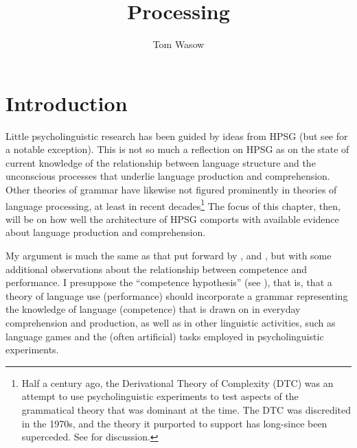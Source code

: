 \documentclass[a4paper]{article}
\title{Processing}
\author{Tom Wasow}
\begin{document}
\maketitle


\section{Introduction}

Little psycholinguistic research has been guided by ideas from HPSG (but see  \citet{Konieczny96a-u} for a notable exception).  This is not so much a reflection on HPSG as on the state of current knowledge of the relationship between language structure and the unconscious processes that underlie language production and comprehension.  Other theories of grammar have likewise not figured prominently in theories of language processing, at least in recent decades\footnote{Half a century ago, the Derivational Theory of Complexity (DTC) was an attempt to use psycholinguistic experiments to test aspects of the grammatical theory that was dominant at the time.  The DTC was discredited in the 1970s, and the theory it purported to support has long-since been superceded.  See \citet{FBG74a-u} for discussion.}  The focus of this chapter, then, will be on how well the architecture of HPSG comports with available evidence about language production and comprehension.  

My argument is much the same as that put forward by \citet[Chapter~9]{SWB2003a}, and \citet{SW2011a,SW2015a}, but with some additional observations about the relationship between competence and performance. I presuppose the ``competence hypothesis'' (see \citealt[Chapter~1]{Chomsky65a}), that is, that a theory of language use (performance) should incorporate a grammar representing the knowledge of language (competence) that is drawn on in everyday comprehension and production, as well as in other linguistic activities, such as language games and the (often artificial) tasks employed in psycholinguistic experiments.  
\end{document}
